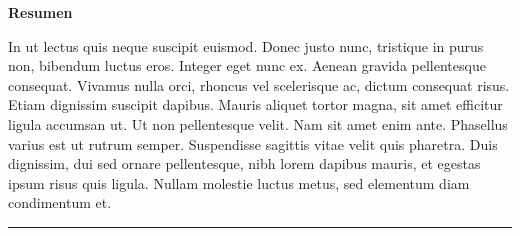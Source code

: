 \documentclass{article}	%
\begin{document}
\begin{minipage}[l][.7\textheight][t]{.90\linewidth}
\begin{adjustwidth}{50pt}{100pt}
\begin{center}
\textbf{Resumen} \par\vspace{0.3cm}
\end{center}
\fontsize{14}{16} \selectfont 
\textsf{In ut lectus quis neque suscipit euismod. Donec justo nunc, tristique in purus non, bibendum luctus eros. Integer eget nunc ex. Aenean gravida pellentesque consequat. Vivamus nulla orci, rhoncus vel scelerisque ac, dictum consequat risus. Etiam dignissim suscipit dapibus. Mauris aliquet tortor magna, sit amet efficitur ligula accumsan ut. Ut non pellentesque velit. Nam sit amet enim ante. Phasellus varius est ut rutrum semper. Suspendisse sagittis vitae velit quis pharetra. Duis dignissim, dui sed ornare pellentesque, nibh lorem dapibus mauris, et egestas ipsum risus quis ligula. Nullam molestie luctus metus, sed elementum diam condimentum et.}

\rule{0.72\textwidth}{0.1cm} \par\vspace{0.3cm}

\fontsize{10}{15} \selectfont  
\begin{center}
\fontsize{11}{11}

\end{center}
\end{adjustwidth}
\end{minipage}

\clearpage
\end{document}
